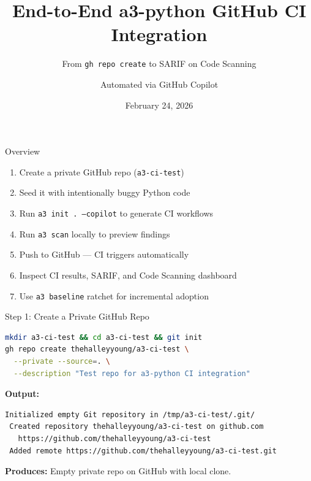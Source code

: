 \documentclass[aspectratio=169]{beamer}
\title{End-to-End a3-python GitHub CI Integration}
\subtitle{From \texttt{gh repo create} to SARIF on Code Scanning}
\author{Automated via GitHub Copilot}
\date{February 24, 2026}
\begin{document}
\begin{frame}
\titlepage
\end{frame}

\begin{frame}{Overview}
\begin{enumerate}
  \item Create a private GitHub repo (\texttt{a3-ci-test})
  \item Seed it with intentionally buggy Python code
  \item Run \texttt{a3 init .\ --copilot} to generate CI workflows
  \item Run \texttt{a3 scan} locally to preview findings
  \item Push to GitHub — CI triggers automatically
  \item Inspect CI results, SARIF, and Code Scanning dashboard
  \item Use \texttt{a3 baseline} ratchet for incremental adoption
\end{enumerate}
\end{frame}

\begin{frame}[fragile]{Step 1: Create a Private GitHub Repo}
\begin{lstlisting}[language=bash]
mkdir a3-ci-test && cd a3-ci-test && git init
gh repo create thehalleyyoung/a3-ci-test \
  --private --source=. \
  --description "Test repo for a3-python CI integration"
\end{lstlisting}

\textbf{Output:}
\begin{lstlisting}
Initialized empty Git repository in /tmp/a3-ci-test/.git/
 Created repository thehalleyyoung/a3-ci-test on github.com
   https://github.com/thehalleyyoung/a3-ci-test
 Added remote https://github.com/thehalleyyoung/a3-ci-test.git
\end{lstlisting}

\textbf{Produces:} Empty private repo on GitHub with local clone.
\end{frame}
\end{document}
